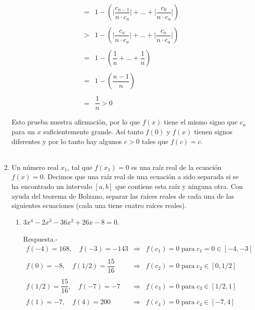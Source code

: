 \begin{enumerate}[\bfseries 1.]
$$\begin{array}{rcl}
							      &=&1-\left(\bigg|\dfrac{c_{n-1}}{n\cdot c_a}\bigg|+\ldots + \bigg|\dfrac{c_0}{n\cdot c_a}\bigg|\right)\\\\
								     &>&1-\left(\bigg|\dfrac{c_a}{n\cdot c_a}\bigg|+\ldots + \bigg|\dfrac{c_a}{n\cdot c_a}\bigg|\right)\\\\
								     &=&1-\left(\dfrac{1}{n}+\ldots + \dfrac{1}{n}\right)\\\\
								     &=&1-\left(\dfrac{n-1}{n}\right)\\\\
								     &=&\dfrac{1}{n}>0\\\\

	\end{array}$$
	Esto prueba nuestra afirmación, por lo que $f(x)$ tiene el mismo signo que $c_n$ para un $x$ suficientemente grande. Así tanto $f(0)$ y $f(x)$ tienen signos diferentes y por lo tanto hay algunos $c>0$ tales que $f(c)=c.$\\\\


    \item Un número real $x_1$, tal que $f(x_1)=0$ es una raíz real de la ecuación $f(x)=0$. Decimos que una raíz real de una ecuación a sido separada si se ha encontrado un intervalo $[a,b]$ que contiene esta raíz y ninguna otra. Con ayuda del teorema de Bolzano, separar las raíces reales de cada una de las siguientes ecuaciones (cada una tiene cuatro raíces reales).

	\begin{enumerate}[\bfseries (a)]

	    \item $3x^4-2x^3-36x^2+26x-8=0.$\\\\
		Respuesta.-\; 
		$$\begin{array}{lcl}
		    f(-4)=168,\quad f(-3)=-143&\Longrightarrow & f(c_1)=0\; \mbox{para}\; c_1=0 \in [-4,-3]\\\\
		    f(0)=-8,\quad f(1/2)=\dfrac{15}{16}&\Longrightarrow & f(c_2)=0\; \mbox{para}\; c_2 \in [0,1/2]\\\\
		    f(1/2)=\dfrac{15}{16},\quad f(-7)=-7&\Longrightarrow & f(c_3)=0\; \mbox{para}\; c_3 \in [1/2,1]\\\\
		    f(1)=-7,\quad f(4)=200&\Longrightarrow & f(c_4)=0\; \mbox{para}\; c_4 \in [-7,4]\\\\
		\end{array}$$


\end{enumerate}
\end{enumerate}
